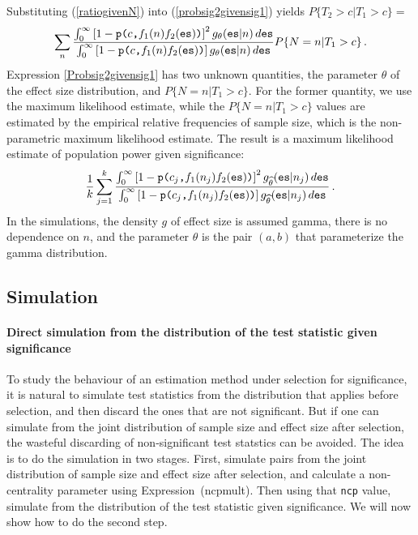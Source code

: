 \documentclass[jou]{apa6} %
\newcommand{\R}[1]{\mbox{\texttt{#1}}} %
\begin{document}
Substituting (\ref{ratiogivenN}) into (\ref{probsig2givensig1}) yields
$ P\{ T_2 > c | T_1 > c\} =$
{\small
\begin{equation} \label{Probsig2givensig1}
    \sum_n 
    \frac{\int_0^\infty\left[1-\R{p(}c\R{,}f_1(n)f_2(\R{es})\R{)}\right]^2
      g_{\theta}(\R{es}|n) \, d\R{es}} 
     {\int_0^\infty\left[1-\R{p(}c\R{,}f_1(n)f_2(\R{es})\R{)}\right]
      g_{\theta}(\R{es}|n) \, d\R{es}} P\{N=n|T_1>c\} \, .
\end{equation}
} %
Expression \ref{Probsig2givensig1} has two unknown quantities, the parameter $\theta$ of the effect size distribution, and $P\{N=n|T_1>c\}$. For the former quantity, we use the maximum likelihood estimate, while the $P\{N=n|T_1>c\}$ values are estimated by the empirical relative frequencies of sample size, which is the non-parametric maximum likelihood estimate. The result is a maximum likelihood estimate of population power given significance:
\begin{equation*} %
    \frac{1}{k} \sum_{j=1}^k 
    \frac{\int_0^\infty\left[1-\R{p(}c_j\R{,}f_1(n_j)f_2(\R{es})\R{)}\right]^2
      g_{\widehat{\theta}}(\R{es}|n_j) \, d\R{es}} 
     {\int_0^\infty\left[1-\R{p(}c_j\R{,}f_1(n_j)f_2(\R{es})\R{)}\right]
      g_{\widehat{\theta}}(\R{es}|n_j) \, d\R{es}}  \, .
\end{equation*}
In the simulations, the density $g$ of effect size is assumed gamma, there is no dependence on $n$, and the parameter $\theta$ is the pair $(a,b)$ that parameterize the gamma distribution.

\subsection{Simulation}

\paragraph{Direct simulation from the distribution of the test statistic given significance}
To study the behaviour of an estimation method under selection for significance, it is natural to simulate test statistics from the distribution that applies before selection, and then discard the ones that are not significant. But if one can simulate from the joint distribution of sample size and effect size after selection, the wasteful discarding of non-significant test statstics can be avoided. The idea is to do the simulation in two stages. First, simulate pairs from the joint distribution of sample size and effect size after selection, and calculate a non-centrality parameter using Expression~(ncpmult). Then using that \texttt{ncp} value, simulate from the distribution of the test statistic given significance. We will now show how to do the second step.
\end{document}
